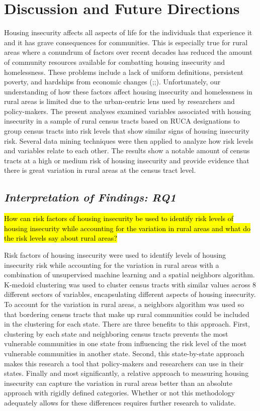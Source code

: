 \chapter{Discussion and Future Directions}	

Housing insecurity affects all aspects of life for the individuals that experience it and it has grave consequences for communities. This is especially true for rural areas where a conundrum of factors over recent decades has reduced the amount of community resources available for combatting housing insecurity and homelessness. These problems include a lack of uniform definitions, persistent poverty, and hardships from economic changes (\citealp{yousey_defining_2018};\citealp{crandall_local_2004};\citealp{pendall_future_2016}\citealp{kropczynski_insights_2012}). Unfortunately, our understanding of how these factors affect housing insecurity and homelessness in rural areas is limited due to the urban-centric lens used by researchers and policy-makers. The present analyses examined variables associated with housing insecurity in a sample of rural census tracts based on RUCA designations to group census tracts into risk levels that show similar signs of housing insecurity risk. Several data mining techniques were then applied to analyze how risk levels and variables relate to each other. The results show a notable amount of census tracts at a high or medium risk of housing insecurity and provide evidence that there is great variation in rural areas at the census tract level. 

\section{\textit{Interpretation of Findings: RQ1}}

\hl{How can risk factors of housing insecurity be used to identify risk levels of housing insecurity while accounting for the variation in rural areas and what do the risk levels say about rural areas?}

Risk factors of housing insecurity were used to identify levels of housing insecurity risk while accounting for the variation in rural areas with a combination of unsupervised machine learning and a spatial neighbors algorithm. K-medoid clustering was used to cluster census tracts with similar values across 8 different sectors of variables, encapsulating different aspects of housing insecurity. To account for the variation in rural areas, a neighbors algorithm was used so that bordering census tracts that make up rural communities could be included in the clustering for each state. There are three benefits to this approach. First, clustering by each state and neighboring census tracts prevents the most vulnerable communities in one state from influencing the risk level of the most vulnerable communities in another state. Second, this state-by-state approach makes this research a tool that policy-makers and researchers can use in their states. Finally and most significantly, a relative approach to measuring housing insecurity can capture the variation in rural areas better than an absolute approach with rigidly defined categories. Whether or not this methodology adequately allows for these differences requires further research to validate.

